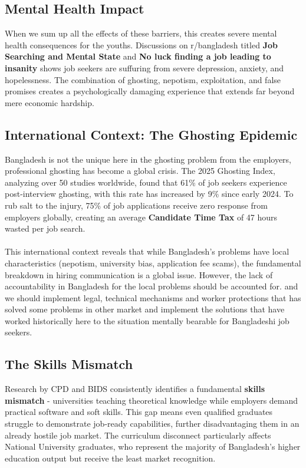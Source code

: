 \documentclass[a4paper, 14pt, openany]{extreport}
\begin{document}
	\subsection{Mental Health Impact}
	
	When we sum up all the effects of these barriers, this creates severe mental health consequences for the youths. Discussions on r/bangladesh titled \textbf{Job Searching and Mental State} and \textbf{No luck finding a job leading to insanity} shows job seekers are suffuring from severe depression, anxiety, and hopelessness\cite{reddit_job_mental_health}\cite{reddit_civil_engineer}. The combination of ghosting, nepotism, exploitation, and false promises creates a psychologically damaging experience that extends far beyond mere economic hardship.
	
	\subsection{International Context: The Ghosting Epidemic}
	
	Bangladesh is not the unique here in the ghosting problem from the employers, professional ghosting has become a global crisis. The 2025 Ghosting Index, analyzing over 50 studies worldwide, found that 61\% of job seekers experience post-interview ghosting, with this rate has increased by 9\% since early 2024\cite{ghosting_index_2025}. To rub salt to the injury, 75\% of job applications receive zero response from employers globally, creating an average \textbf{Candidate Time Tax} of 47 hours wasted per job search.
	\\
	\\
	This international context reveals that while Bangladesh's problems have local characteristics (nepotism, university bias, application fee scams), the fundamental breakdown in hiring communication is a global issue. However, the lack of accountability in Bangladesh for the local problems should be accounted for. and we should implement legal, technical mechanisms and worker protections that has solved some problems in other market and implement the solutions that have worked historically here to the situation mentally bearable for Bangladeshi job seekers.
	
	\subsection{The Skills Mismatch}
	
	Research by CPD and BIDS consistently identifies a fundamental \textbf{skills mismatch} - universities teaching theoretical knowledge while employers demand practical software and soft skills\cite{cpd_employment_2024}\cite{dhaka_tribune_nu_graduates}. This gap means even qualified graduates struggle to demonstrate job-ready capabilities, further disadvantaging them in an already hostile job market. The curriculum disconnect particularly affects National University graduates, who represent the majority of Bangladesh's higher education output but receive the least market recognition.
	
\end{document}
